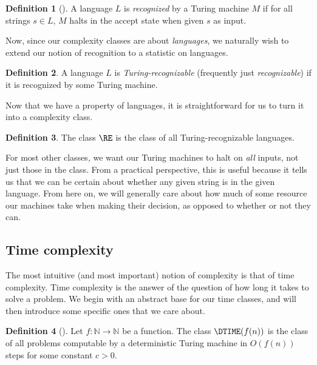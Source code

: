 \documentclass[english]{reedthesis}
\theoremstyle{plain}
\theoremstyle{definition}
\newtheorem{defn}[defn]{Definition}
\theoremstyle{remark}
\begin{document}
\begin{defn}[{\cite[Def.\ 3.2]{Sip97}}]\label{def:recognition}
  A language $L$ is \emph{recognized} by a Turing machine $M$ if for all strings
  $s \in L$, $M$ halts in the accept state when given $s$ as input.
\end{defn}

Now, since our complexity classes are about \emph{languages}, we naturally wish
to extend our notion of recognition to a statistic on languages.

\begin{defn}\label{def:turing-recognizable}
  A language $L$ is \emph{Turing-recognizable} (frequently just
  \emph{recognizable}) if it is recognized by some Turing machine.
\end{defn}

Now that we have a property of languages, it is straightforward for us to turn
it into a complexity class.

\begin{defn}\label{def:re}
  The class $\RE$ is the class of all Turing-recognizable languages.
\end{defn}

For most other classes, we want our Turing machines to halt on \emph{all}
inputs, not just those in the class. From a practical perspective, this is
useful because it tells us that we can be certain about whether any given string
is in the given language. From here on, we will generally care about how much of
some resource our machines take when making their decision, as opposed to
whether or not they can.

\subsection{Time complexity}

The most intuitive (and most important) notion of complexity is that of time
complexity. Time complexity is the answer of the question of how long it takes
to solve a problem. We begin with an abstract base for our time classes, and
will then introduce some specific ones that we care about.

\begin{defn}[{\cite[Def.\ 1.19]{AB09}}]\label{def:dtime}
  Let $f: \mathbb{N} \rightarrow \mathbb{N}$ be a function. The class $\DTIME(f(n))$ is the class of all
  problems computable by a deterministic Turing machine in $O(f(n))$ steps for
  some constant $c > 0$.
\end{defn}
\end{document}
